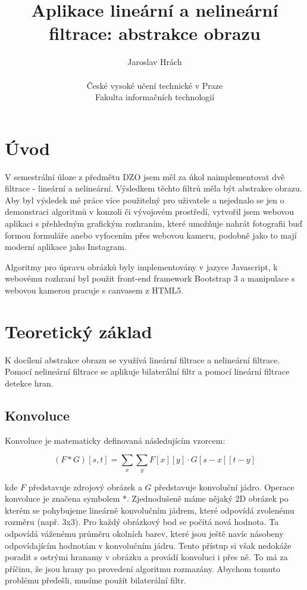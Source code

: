 \documentclass[11pt,oneside]{article}
\begin{document}
	\title{Aplikace lineární a nelineární filtrace: abstrakce obrazu}
	\author{Jaroslav Hrách\\\\České vysoké učení technické v Praze\\Fakulta informačních technologií}
	\maketitle

\section{Úvod}
\par{V semestrální úloze z předmětu DZO jsem měl za úkol naimplementovat dvě filtrace - lineární a nelineární. Výsledkem těchto filtrů měla být abstrakce obrazu. Aby byl výsledek mé práce více použitelný pro uživatele a nejednalo se jen o demonstraci algoritmů v konzoli či vývojovém prostředí, vytvořil jsem webovou aplikaci s přehledným grafickým rozhraním, které umožňuje nahrát fotografii buď formou formuláře anebo vyfocením přes webovou kameru, podobně jako to mají moderní aplikace jako Instagram.}

\par{Algoritmy pro úpravu obrázků byly implementovány v jazyce Javascript, k webovému rozhraní byl použit front-end framework Bootstrap 3 a manipulace s webovou kamerou pracuje s canvasem z HTML5.}

\section{Teoretický základ}
\par{K docílení abstrakce obrazu se využívá lineární filtrace a nelineární filtrace. Pomocí nelineární filtrace se aplikuje bilaterální filtr a pomocí lineární filtrace detekce hran.}

\subsection{Konvoluce}

Konvoluce je matematicky definovaná následujícím vzorcem:

\[
(F * G)[s, t] = \sum_{x} \sum_{y} F[x][y] \cdot G[s-x][t-y]
\]

kde $F$ představuje zdrojový obrázek a $G$ představuje konvoluční jádro. Operace konvoluce je značena symbolem $*$. Zjednodušeně máme nějaký 2D obrázek po kterém se pohybujeme lineárně konvolučním jádrem, které odpovídá zvolenému rozměru (např. 3x3). Pro každý obrázkový bod se počítá nová hodnota. Ta odpovídá váženému průměru okolních barev, které jsou ještě navíc násobeny odpovídajícím hodnotám v konvolučním jádru. Tento přístup si však nedokáže poradit s ostrými hranamy v obrázku a provádí konvoluci i přes ně. To má za příčinu, že jsou hrany po provedení algoritmu rozmazány. Abychom tomuto problému předešli, musíme použít bilaterální filtr.
\end{document}
